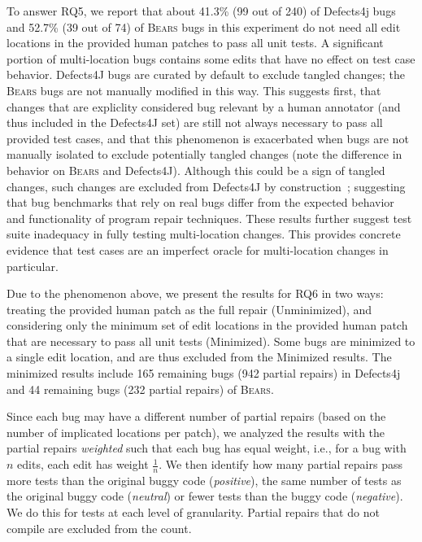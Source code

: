 \documentclass[10pt, conference]{IEEEtran}
\newcommand\bears{\textsc{Bears}\xspace}
\begin{document}
To answer RQ5, we report that about 41.3\%  (99 out of 240) of Defects4j bugs and 52.7\% (39 out of 74) of
\bears bugs in this experiment do not need all edit locations in the provided human patches 
to pass
all unit tests. A significant portion of multi-location bugs contains some
edits that have no effect on test case behavior.  Defects4J bugs are curated by
default to exclude tangled changes; the \bears bugs are not manually modified in
this way.  This suggests first, that changes that are expliclity considered bug
relevant by a human annotator (and thus included in the Defects4J set) are still
not always necessary to pass all provided test cases, and that this phenomenon
is exacerbated when bugs are not manually isolated to exclude potentially tangled
changes (note the difference in behavior on \bears and Defects4J).  
Although this could
be a sign of tangled changes, such changes are excluded from Defects4J by
construction~\cite{defects4j}; suggesting
that bug benchmarks that rely on real bugs differ from the expected behavior and 
functionality of program repair techniques.  These results further suggest test
suite inadequacy in fully testing multi-location
changes. This provides concrete evidence that
test cases are an imperfect oracle for multi-location changes in particular. 

Due to the phenomenon above, we present the results for RQ6 in two ways:
treating the provided human patch as the full repair
(Unminimized), and considering only the minimum set of edit locations in the
provided human patch that are necessary
to pass all unit tests (Minimized).
Some bugs are minimized to a single edit location, and are thus excluded 
from the Minimized results. The minimized results 
include 165 remaining bugs (942 partial repairs) in Defects4j and 44 remaining bugs (232 partial repairs) of \bears. 

Since each bug may have a different 
number of partial repairs (based on the number of implicated locations per
patch), we analyzed the results with the partial repairs \emph{weighted} such that each bug
has equal weight, i.e., for a bug with $n$ edits, each edit has weight 
$\frac{1}{n}$.  We then identify how many partial repairs pass more tests
than the original buggy code (\emph{positive}), the  same number of tests as the
original buggy code (\emph{neutral}) or fewer tests than the buggy code
(\emph{negative}).  We do this for tests at each level of granularity.  Partial
repairs that do not compile are
excluded from the count. 
\end{document}
